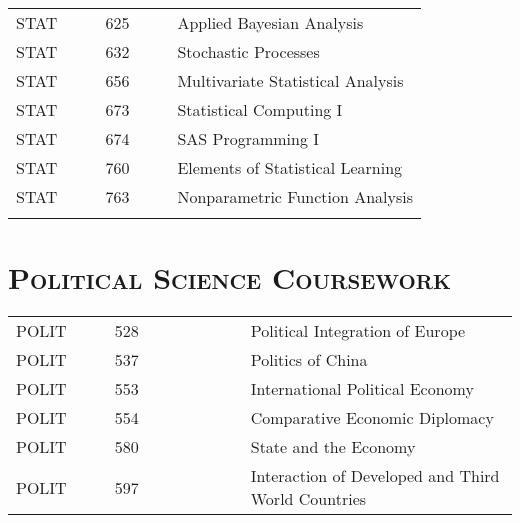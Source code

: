 \begin{resume}
\begin{tabular}{lllll}
STAT      & \ \ &  625  & \ \ &  Applied Bayesian Analysis \\
STAT      & \ \ &  632  & \ \ &  Stochastic Processes \\
STAT      & \ \ &  656  & \ \ &  Multivariate Statistical Analysis \\
STAT      & \ \ &  673  & \ \ &  Statistical Computing I \\
STAT      & \ \ &  674  & \ \ &  SAS Programming I \\
STAT      & \ \ &  760  & \ \ &  Elements of Statistical Learning \\
STAT      & \ \ &  763  & \ \ &  Nonparametric Function Analysis \\ \\



\end{tabular}


\section{\textsc{Political Science Coursework}}
\begin{tabular}{lllll}
POLIT       & \ \ & 528  & \ \ \ \ \ \ \ \ \ \   &  Political Integration of Europe \\
POLIT      & \ \ & 537  & \ \ &  Politics of China \\
POLIT      & \ \ & 553  & \ \ &  International Political Economy \\
POLIT      & \ \ & 554  & \ \ &  Comparative Economic Diplomacy \\
POLIT      & \ \ & 580  & \ \ &  State and the Economy \\
POLIT      & \ \ & 597  & \ \ &  Interaction of Developed and Third World Countries\\
\end{tabular}






\end{resume}




